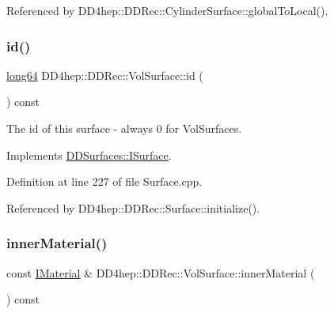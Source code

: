 Referenced by D\+D4hep\+::\+D\+D\+Rec\+::\+Cylinder\+Surface\+::global\+To\+Local().

\hypertarget{class_d_d4hep_1_1_d_d_rec_1_1_vol_surface_a4aca7e181f70ca7319025692b8afd6a6}{}\label{class_d_d4hep_1_1_d_d_rec_1_1_vol_surface_a4aca7e181f70ca7319025692b8afd6a6} 
\subsubsection{\texorpdfstring{id()}{id()}}
{\footnotesize\ttfamily \hyperlink{namespace_d_d_surfaces_ab6b3da366f31f80aec56447ac4442e78}{long64} D\+D4hep\+::\+D\+D\+Rec\+::\+Vol\+Surface\+::id (\begin{DoxyParamCaption}{ }\end{DoxyParamCaption}) const\hspace{0.3cm}{\ttfamily [virtual]}}



The id of this surface -\/ always 0 for Vol\+Surfaces. 



Implements \hyperlink{class_d_d_surfaces_1_1_i_surface_aaf7bf967d4a0652c620ec9754a2b37c1}{D\+D\+Surfaces\+::\+I\+Surface}.



Definition at line 227 of file Surface.\+cpp.



Referenced by D\+D4hep\+::\+D\+D\+Rec\+::\+Surface\+::initialize().

\hypertarget{class_d_d4hep_1_1_d_d_rec_1_1_vol_surface_a102814166f4ba579d3587ed0b5284aa4}{}\label{class_d_d4hep_1_1_d_d_rec_1_1_vol_surface_a102814166f4ba579d3587ed0b5284aa4} 
\subsubsection{\texorpdfstring{inner\+Material()}{innerMaterial()}}
{\footnotesize\ttfamily const \hyperlink{class_d_d_surfaces_1_1_i_material}{I\+Material} \& D\+D4hep\+::\+D\+D\+Rec\+::\+Vol\+Surface\+::inner\+Material (\begin{DoxyParamCaption}{ }\end{DoxyParamCaption}) const\hspace{0.3cm}{\ttfamily [virtual]}}



